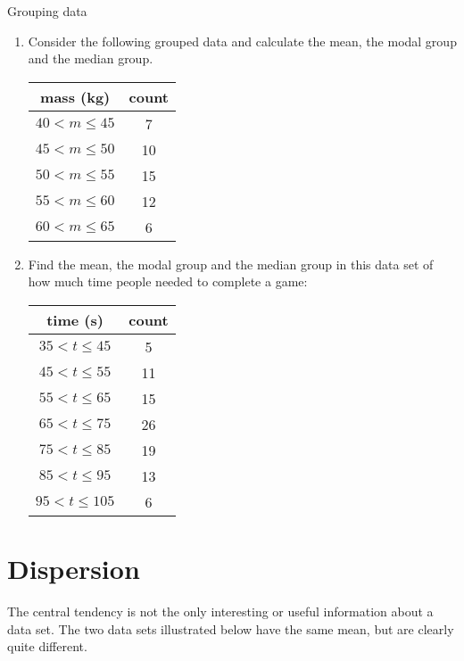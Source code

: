 \begin{exercises}{Grouping data}
  \begin{enumerate}[noitemsep, label=\textbf{\arabic*}.]

  \item Consider the following grouped data and calculate the mean,
    the modal group and the median group.

    \begin{center}
      \begin{tabular}{cc}
        \toprule
        mass (kg) & count \\
        \midrule
        $40 < m \le 45$ & 7 \\
        $45 < m \le 50$ & 10 \\
        $50 < m \le 55$ & 15 \\
        $55 < m \le 60$ & 12 \\
        $60 < m \le 65$ & 6 \\
        \bottomrule
      \end{tabular}
    \end{center}

  \item Find the mean, the modal group and the median group in this
    data set of how much time people needed to complete a game:
    \begin{center}
      \begin{tabular}{cc}
        \toprule
        time (s) & count \\
        \midrule
        $35 < t \le 45$ & 5 \\
        $45 < t \le 55$ & 11 \\
        $55 < t \le 65$ & 15 \\
        $65 < t \le 75$ & 26 \\
        $75 < t \le 85$ & 19 \\
        $85 < t \le 95$ & 13 \\
        $95 < t \le 105$ & 6 \\
        \bottomrule
      \end{tabular}
    \end{center}

  \end{enumerate}
\end{exercises}

\section{Dispersion}
The central tendency is not the only interesting or useful information
about a data set. The two data sets illustrated below have the same mean,
but are clearly quite different.

